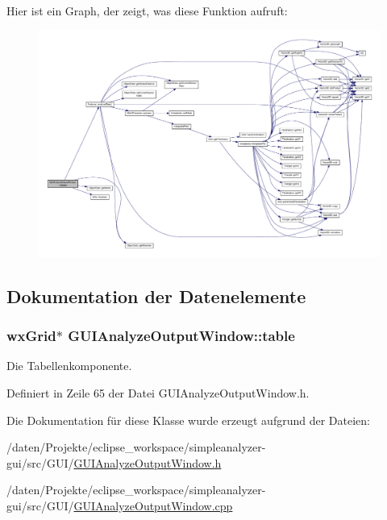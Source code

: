 Hier ist ein Graph, der zeigt, was diese Funktion aufruft\-:\nopagebreak
\begin{figure}[H]
\begin{center}
\leavevmode
\includegraphics[width=350pt]{classGUIAnalyzeOutputWindow_a9ea5a7cf46d6189f368315903508cecc_cgraph}
\end{center}
\end{figure}




\subsection{Dokumentation der Datenelemente}
\hypertarget{classGUIAnalyzeOutputWindow_afa1bc15fd767bfb9922e880403fb4305}{
\subsubsection[{table}]{\setlength{\rightskip}{0pt plus 5cm}wx\-Grid$\ast$ G\-U\-I\-Analyze\-Output\-Window\-::table\hspace{0.3cm}{\ttfamily [private]}}}\label{classGUIAnalyzeOutputWindow_afa1bc15fd767bfb9922e880403fb4305}


Die Tabellenkomponente. 



Definiert in Zeile 65 der Datei G\-U\-I\-Analyze\-Output\-Window.\-h.



Die Dokumentation für diese Klasse wurde erzeugt aufgrund der Dateien\-:\begin{DoxyCompactItemize}
\item 
/daten/\-Projekte/eclipse\-\_\-workspace/simpleanalyzer-\/gui/src/\-G\-U\-I/\hyperlink{GUIAnalyzeOutputWindow_8h}{G\-U\-I\-Analyze\-Output\-Window.\-h}\item 
/daten/\-Projekte/eclipse\-\_\-workspace/simpleanalyzer-\/gui/src/\-G\-U\-I/\hyperlink{GUIAnalyzeOutputWindow_8cpp}{G\-U\-I\-Analyze\-Output\-Window.\-cpp}\end{DoxyCompactItemize}
